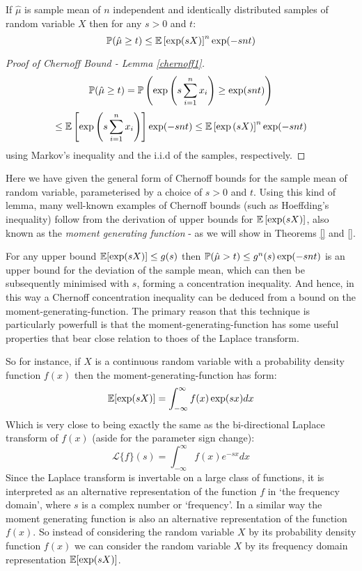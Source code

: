 \begin{lemma}\label{chernoff1}
If $\hat{\mu}$ is sample mean of $n$ independent and identically distributed samples of random variable $X$ then for any $s>0$ and $t$:
\[ \operatorname{\mathbb{P}}(\hat{\mu}\ge t)\le\operatorname{\mathbb{E}}\left[\exp(sX)\right]^n\exp(-snt) \]
\end{lemma}
\begin{proof}[Proof of Chernoff Bound - Lemma \ref{chernoff1}]
$$\operatorname{\mathbb{P}}(\hat{\mu}\ge t) =  \operatorname{\mathbb{P}}\left(\exp\left(s\sum_{i=1}^nx_i\right)\ge \exp(snt)\right)$$
$$\le \operatorname{\mathbb{E}}\left[\exp\left(s\sum_{i=1}^nx_i\right)\right]\exp(-snt) \le \operatorname{\mathbb{E}}\left[\exp\left(sX\right)\right]^n\exp(-snt)
$$
using Markov's inequality and the i.i.d of the samples, respectively.
\end{proof}

Here we have given the general form of Chernoff bounds for the sample mean of random variable, parameterised by a choice of $s>0$ and $t$.
Using this kind of lemma, many well-known examples of Chernoff bounds (such as Hoeffding's inequality) follow from the derivation of upper bounds for $\operatorname{\mathbb{E}}\left[\exp(sX)\right]$, also known as the \textit{moment generating function} - as we will show in Theorems \ref{} and \ref{}.

For any upper bound $\operatorname{\mathbb{E}}[\exp(sX)]\le g(s)$ then $\operatorname{\mathbb{P}}(\hat{\mu}>t)\le g^n(s)\exp(-snt)$ is an upper bound for the deviation of the sample mean, which can then be subsequently minimised with $s$, forming a concentration inequality.
And hence, in this way a Chernoff concentration inequality can be deduced from a bound on the moment-generating-function.
The primary reason that this technique is particularly powerfull is that the moment-generating-function has some useful properties that bear close relation to thoes of the Laplace transform.

So for instance, if $X$ is a continuous random variable with a probability density function $f(x)$ then the moment-generating-function has form:
$$ \operatorname{\mathbb{E}}[\exp(sX)] = \int_{-\infty}^\infty f(x)\exp(sx) dx $$
Which is very close to being exactly the same as the bi-directional Laplace transform of $f(x)$ (aside for the parameter sign change):
$$ \mathcal{L}\{f\}(s) = \int_{-\infty}^\infty f(x)e^{-sx} dx$$
Since the Laplace transform is invertable on a large class of functions, it is interpreted as an alternative representation of the function $f$ in `the frequency domain', where $s$ is a complex number or `frequency'.
In a similar way the moment generating function is also an alternative representation of the function $f(x)$.
So instead of considering the random variable $X$ by its probability density function $f(x)$ we can consider the random variable $X$ by its frequency domain representation $\operatorname{\mathbb{E}}[\exp(sX)]$.

